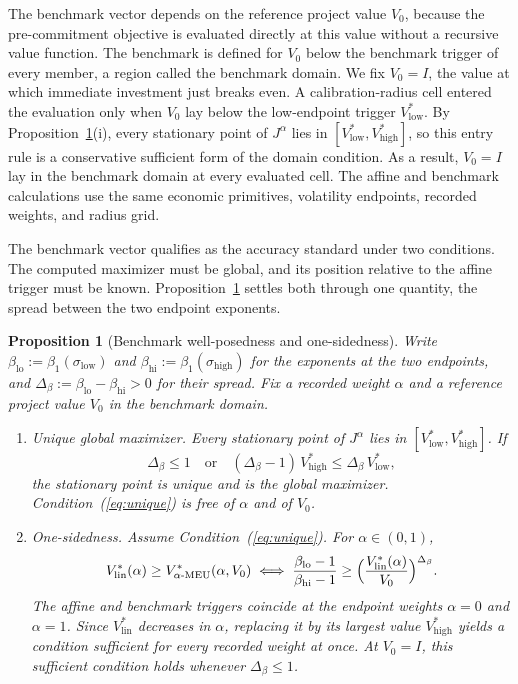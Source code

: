 \documentclass[5p,times,authoryear]{elsarticle}
\theoremstyle{plain}
\newtheorem{proposition}{Proposition}
\newcommand{\Vlow}{V^{*}_{\mathrm{low}}}
\newcommand{\Vhigh}{V^{*}_{\mathrm{high}}}
\newcommand{\Vlin}{V^{*}_{\mathrm{lin}}}
\newcommand{\VMEU}{V^{*}_{\alpha\text{-MEU}}}
\newcommand{\slow}{\sigma_{\mathrm{low}}}
\newcommand{\shigh}{\sigma_{\mathrm{high}}}
\newcommand{\blo}{\beta_{\mathrm{lo}}}
\newcommand{\bhi}{\beta_{\mathrm{hi}}}
\newcommand{\Db}{\Delta_{\beta}}
\begin{document}
The benchmark vector depends on the reference project value $V_0$, because the pre-commitment objective is evaluated directly at this value without a recursive value function. The benchmark is defined for $V_0$ below the benchmark trigger of every member, a region called the benchmark domain. We fix $V_0=I$, the value at which immediate investment just breaks even. A calibration-radius cell entered the evaluation only when $V_0$ lay below the low-endpoint trigger $\Vlow$. By Proposition~\ref{prop:benchmark}(i), every stationary point of $J^{\alpha}$ lies in $[\Vlow,\Vhigh]$, so this entry rule is a conservative sufficient form of the domain condition. As a result, $V_0=I$ lay in the benchmark domain at every evaluated cell. The affine and benchmark calculations use the same economic primitives, volatility endpoints, recorded weights, and radius grid.

The benchmark vector qualifies as the accuracy standard under two conditions. The computed maximizer must be global, and its position relative to the affine trigger must be known. Proposition~\ref{prop:benchmark} settles both through one quantity, the spread between the two endpoint exponents.

\begin{proposition}[Benchmark well-posedness and one-sidedness]\label{prop:benchmark}
Write $\blo:=\beta_1(\slow)$ and $\bhi:=\beta_1(\shigh)$ for the exponents at the two endpoints, and $\Db:=\blo-\bhi>0$ for their spread. Fix a recorded weight $\alpha$ and a reference project value $V_0$ in the benchmark domain.
\begin{enumerate}
\item[(i)] Unique global maximizer. Every stationary point of $J^{\alpha}$ lies in $[\Vlow,\Vhigh]$. If
\begin{equation}
\Db\le 1\quad\text{or}\quad(\Db-1)\,\Vhigh\le\Db\,\Vlow,
\label{eq:unique}
\end{equation}
the stationary point is unique and is the global maximizer. Condition~(\ref{eq:unique}) is free of $\alpha$ and of $V_0$.
\item[(ii)] One-sidedness. Assume Condition~(\ref{eq:unique}). For $\alpha\in(0,1)$,
\begin{equation}
\Vlin(\alpha)\ge\VMEU(\alpha,V_0)\iff\frac{\blo-1}{\bhi-1}\ge\Bigl(\frac{\Vlin(\alpha)}{V_0}\Bigr)^{\Db}.
\label{eq:onesided}
\end{equation}
The affine and benchmark triggers coincide at the endpoint weights $\alpha=0$ and $\alpha=1$. Since $\Vlin$ decreases in $\alpha$, replacing it by its largest value $\Vhigh$ yields a condition sufficient for every recorded weight at once. At $V_0=I$, this sufficient condition holds whenever $\Db\le1$.
\end{enumerate}
\end{proposition}
\end{document}
